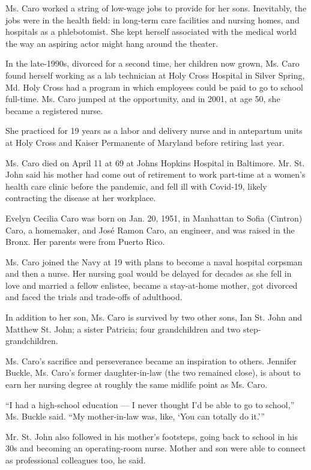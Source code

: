 Ms. Caro worked a string of low-wage jobs to provide for her sons.
Inevitably, the jobs were in the health field: in long-term care
facilities and nursing homes, and hospitals as a phlebotomist. She kept
herself associated with the medical world the way an aspiring actor
might hang around the theater.

In the late-1990s, divorced for a second time, her children now grown,
Ms. Caro found herself working as a lab technician at Holy Cross
Hospital in Silver Spring, Md. Holy Cross had a program in which
employees could be paid to go to school full-time. Ms. Caro jumped at
the opportunity, and in 2001, at age 50, she became a registered nurse.

She practiced for 19 years as a labor and delivery nurse and in
antepartum units at Holy Cross and Kaiser Permanente of Maryland before
retiring last year.

Ms. Caro died on April 11 at 69 at Johns Hopkins Hospital in Baltimore.
Mr. St. John said his mother had come out of retirement to work
part-time at a women's health care clinic before the pandemic, and fell
ill with Covid-19, likely contracting the disease at her workplace.

Evelyn Cecilia Caro was born on Jan. 20, 1951, in Manhattan to Sofia
(Cintron) Caro, a homemaker, and José Ramon Caro, an engineer, and was
raised in the Bronx. Her parents were from Puerto Rico.

Ms. Caro joined the Navy at 19 with plans to become a naval hospital
corpsman and then a nurse. Her nursing goal would be delayed for decades
as she fell in love and married a fellow enlistee, became a stay-at-home
mother, got divorced and faced the trials and trade-offs of adulthood.

In addition to her son, Ms. Caro is survived by two other sons, Ian St.
John and Matthew St. John; a sister Patricia; four grandchildren and two
step-grandchildren.

Ms. Caro's sacrifice and perseverance became an inspiration to others.
Jennifer Buckle, Ms. Caro's former daughter-in-law (the two remained
close), is about to earn her nursing degree at roughly the same midlife
point as Ms. Caro.

``I had a high-school education --- I never thought I'd be able to go to
school,'' Ms. Buckle said. ``My mother-in-law was, like, `You can
totally do it.'''

Mr. St. John also followed in his mother's footsteps, going back to
school in his 30s and becoming an operating-room nurse. Mother and son
were able to connect as professional colleagues too, he said.

